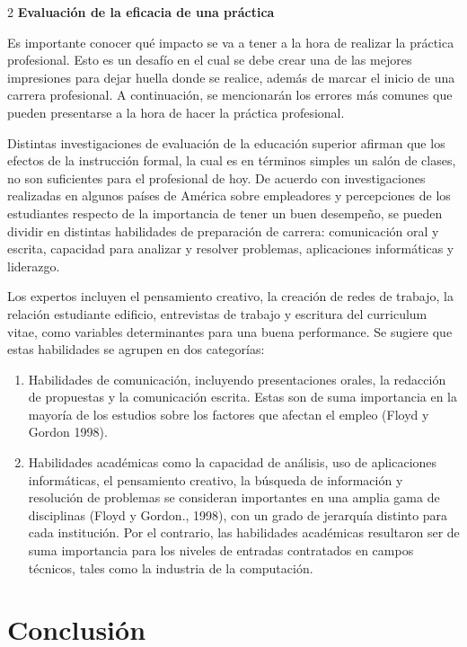 \documentclass[12pt,spanish,Letterpaper,openany]{book}
\begin{document}
\begin {multicols}{2}
\textbf{Evaluación de la eficacia de una práctica}

Es importante conocer qué impacto se va a tener a la hora de realizar la práctica profesional. Esto es un desafío en el cual se debe crear una de las mejores impresiones para dejar huella donde se realice, además de marcar el inicio de una carrera profesional. A continuación, se mencionarán los errores más comunes que pueden presentarse a la hora de hacer la práctica profesional.

Distintas investigaciones de evaluación de la educación superior afirman que los efectos de la instrucción formal, la cual es en términos simples un salón de clases, no son suficientes para el profesional de hoy. De acuerdo con investigaciones realizadas en algunos países de América sobre empleadores y percepciones de los estudiantes respecto de la importancia de tener un buen desempeño, se pueden dividir en distintas habilidades de preparación de carrera: comunicación oral y escrita, capacidad para analizar y resolver problemas, aplicaciones informáticas y liderazgo.

Los expertos incluyen el pensamiento creativo, la creación de redes de trabajo, la relación estudiante edificio, entrevistas de trabajo y escritura del curriculum vitae, como variables determinantes para una buena performance. Se sugiere que estas habilidades se agrupen en dos categorías:

\begin{enumerate}
\def\labelenumi{\arabic{enumi}.}
\item
  Habilidades de comunicación, incluyendo presentaciones orales, la redacción de propuestas y la comunicación escrita. Estas son de suma importancia en la mayoría de los estudios sobre los factores que afectan el empleo (Floyd y Gordon 1998).
\item
  Habilidades académicas como la capacidad de análisis, uso de aplicaciones informáticas, el pensamiento creativo, la búsqueda de información y resolución de problemas se consideran importantes en una amplia gama de disciplinas (Floyd y Gordon., 1998), con un grado de jerarquía distinto para cada institución. Por el contrario, las habilidades académicas resultaron ser de suma importancia para los niveles de entradas contratados en campos técnicos, tales como la industria de la computación.
\end{enumerate}

\hypertarget{conclusiuxf3n}{%
\section{Conclusión}\label{conclusiuxf3n}}


\end{multicols}
\end{document}

